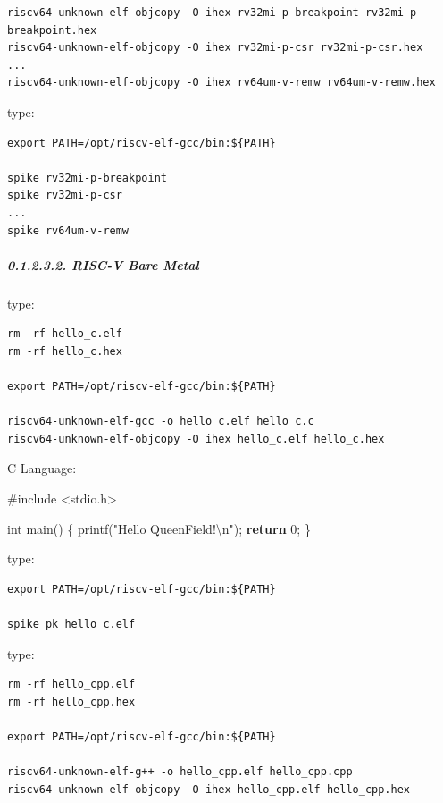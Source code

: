 \documentclass[
]{article}
\newenvironment{Shaded}{}{}
\newcommand{\ControlFlowTok}[1]{\textcolor[rgb]{0.00,0.44,0.13}{\textbf{#1}}}
\newcommand{\DataTypeTok}[1]{\textcolor[rgb]{0.56,0.13,0.00}{#1}}
\newcommand{\DecValTok}[1]{\textcolor[rgb]{0.25,0.63,0.44}{#1}}
\newcommand{\ImportTok}[1]{#1}
\newcommand{\NormalTok}[1]{#1}
\newcommand{\PreprocessorTok}[1]{\textcolor[rgb]{0.74,0.48,0.00}{#1}}
\newcommand{\SpecialCharTok}[1]{\textcolor[rgb]{0.25,0.44,0.63}{#1}}
\newcommand{\StringTok}[1]{\textcolor[rgb]{0.25,0.44,0.63}{#1}}
\begin{document}
\begin{verbatim}
riscv64-unknown-elf-objcopy -O ihex rv32mi-p-breakpoint rv32mi-p-breakpoint.hex
riscv64-unknown-elf-objcopy -O ihex rv32mi-p-csr rv32mi-p-csr.hex
...
riscv64-unknown-elf-objcopy -O ihex rv64um-v-remw rv64um-v-remw.hex
\end{verbatim}

type:

\begin{verbatim}
export PATH=/opt/riscv-elf-gcc/bin:${PATH}

spike rv32mi-p-breakpoint
spike rv32mi-p-csr
...
spike rv64um-v-remw
\end{verbatim}

\hypertarget{risc-v-bare-metal}{%
\subparagraph{0.1.2.3.2. RISC-V Bare Metal}\label{risc-v-bare-metal}}

type:

\begin{verbatim}
rm -rf hello_c.elf
rm -rf hello_c.hex

export PATH=/opt/riscv-elf-gcc/bin:${PATH}

riscv64-unknown-elf-gcc -o hello_c.elf hello_c.c
riscv64-unknown-elf-objcopy -O ihex hello_c.elf hello_c.hex
\end{verbatim}

C Language:

\begin{Shaded}
\begin{Highlighting}[]
\PreprocessorTok{\#include }\ImportTok{\textless{}stdio.h\textgreater{}}

\DataTypeTok{int}\NormalTok{ main() \{}
\NormalTok{  printf(}\StringTok{"Hello QueenField!}\SpecialCharTok{\textbackslash{}n}\StringTok{"}\NormalTok{);}
  \ControlFlowTok{return} \DecValTok{0}\NormalTok{;}
\NormalTok{\}}
\end{Highlighting}
\end{Shaded}

type:

\begin{verbatim}
export PATH=/opt/riscv-elf-gcc/bin:${PATH}

spike pk hello_c.elf
\end{verbatim}

type:

\begin{verbatim}
rm -rf hello_cpp.elf
rm -rf hello_cpp.hex

export PATH=/opt/riscv-elf-gcc/bin:${PATH}

riscv64-unknown-elf-g++ -o hello_cpp.elf hello_cpp.cpp
riscv64-unknown-elf-objcopy -O ihex hello_cpp.elf hello_cpp.hex
\end{verbatim}
\end{document}
